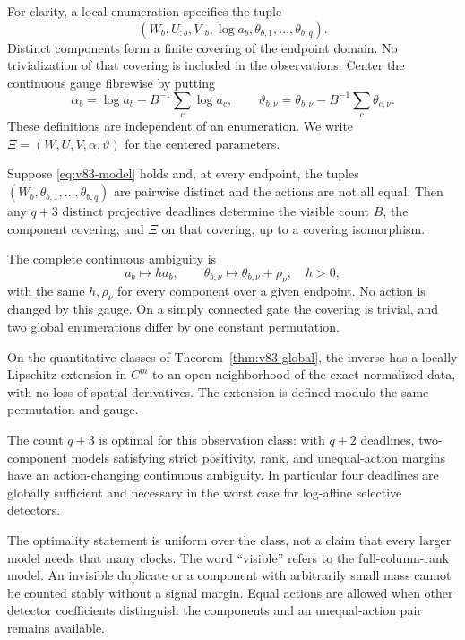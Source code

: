 For clarity, a local enumeration specifies the tuple
\[
 (W_b,U_{:b},V_{:b},\log a_b,\theta_{b,1},\ldots,\theta_{b,q}).
\]
Distinct components form a finite covering of the endpoint domain. No
trivialization of that covering is included in the observations.
Center the continuous gauge fibrewise by putting
\begin{equation}\label{eq:v83-center}
 \alpha_b=\log a_b-B^{-1}\sum_c\log a_c,\qquad
 \vartheta_{b,\nu}=\theta_{b,\nu}-B^{-1}\sum_c\theta_{c,\nu}.
\end{equation}
These definitions are independent of an enumeration. We write
$\Xi=(W,U,V,\alpha,\vartheta)$ for the centered parameters.

\begin{theorem}\label{thm:v83-main}
Suppose \eqref{eq:v83-model} holds and, at every endpoint, the tuples
$(W_b,\theta_{b,1},\ldots,\theta_{b,q})$ are pairwise distinct and the
actions are not all equal. Then any $q+3$ distinct projective deadlines
determine the visible count $B$, the component covering, and $\Xi$ on
that covering, up to a covering isomorphism.

The complete continuous ambiguity is
\begin{equation}\label{eq:v83-gauge}
 a_b\mapsto h a_b,\qquad
 \theta_{b,\nu}\mapsto\theta_{b,\nu}+\rho_\nu,
 \quad h>0,
\end{equation}
with the same $h,\rho_\nu$ for every component over a given endpoint.
No action is changed by this gauge. On a simply connected gate the
covering is trivial, and two global enumerations differ by one constant
permutation.

On the quantitative classes of Theorem~\ref{thm:v83-global}, the inverse
has a locally Lipschitz extension in $C^m$ to an open neighborhood of
the exact normalized data, with no loss of spatial derivatives. The
extension is defined modulo the same permutation and gauge.

The count $q+3$ is optimal for this observation class: with $q+2$
deadlines, two-component models satisfying strict positivity, rank,
and unequal-action margins have an action-changing continuous ambiguity.
In particular four deadlines are globally sufficient and necessary in
the worst case for log-affine selective detectors.
\end{theorem}

The optimality statement is uniform over the class, not a claim that
every larger model needs that many clocks. The word ``visible'' refers
to the full-column-rank model. An invisible duplicate or a component
with arbitrarily small mass cannot be counted stably without a signal
margin. Equal actions are allowed when other detector coefficients
distinguish the components and an unequal-action pair remains available.

